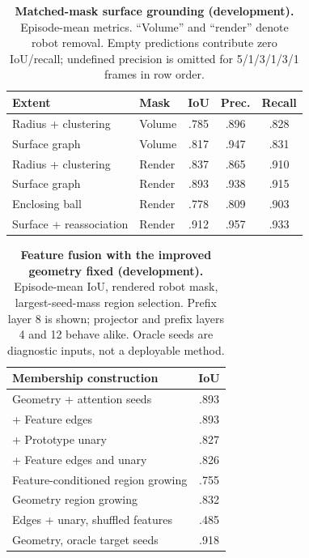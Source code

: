 \documentclass[10pt,twocolumn,letterpaper]{article}
\begin{document}
\begin{table}[h]
\centering
\caption{\textbf{Matched-mask surface grounding (development).} Episode-mean metrics. ``Volume'' and ``render'' denote robot removal. Empty predictions contribute zero IoU/recall; undefined precision is omitted for 5/1/3/1/3/1 frames in row order.}
\label{tab:supp-extent}
\small
\begin{tabular}{llccc}
\toprule
Extent & Mask & IoU & Prec. & Recall\\
\midrule
Radius + clustering & Volume & .785 & .896 & .828\\
Surface graph & Volume & .817 & .947 & .831\\
Radius + clustering & Render & .837 & .865 & .910\\
Surface graph & Render & .893 & .938 & .915\\
Enclosing ball & Render & .778 & .809 & .903\\
Surface + reassociation & Render & .912 & .957 & .933\\
\bottomrule
\end{tabular}
\end{table}

\begin{table}[h]
\centering
\caption{\textbf{Feature fusion with the improved geometry fixed (development).} Episode-mean IoU, rendered robot mask, largest-seed-mass region selection. Prefix layer 8 is shown; projector and prefix layers 4 and 12 behave alike. Oracle seeds are diagnostic inputs, not a deployable method.}
\label{tab:supp-features}
\small
\begin{tabular}{lc}
\toprule
Membership construction & IoU\\
\midrule
Geometry + attention seeds & .893\\
+ Feature edges & .893\\
+ Prototype unary & .827\\
+ Feature edges and unary & .826\\
Feature-conditioned region growing & .755\\
Geometry region growing & .832\\
Edges + unary, shuffled features & .485\\
Geometry, oracle target seeds & .918\\
\bottomrule
\end{tabular}
\end{table}
\end{document}

